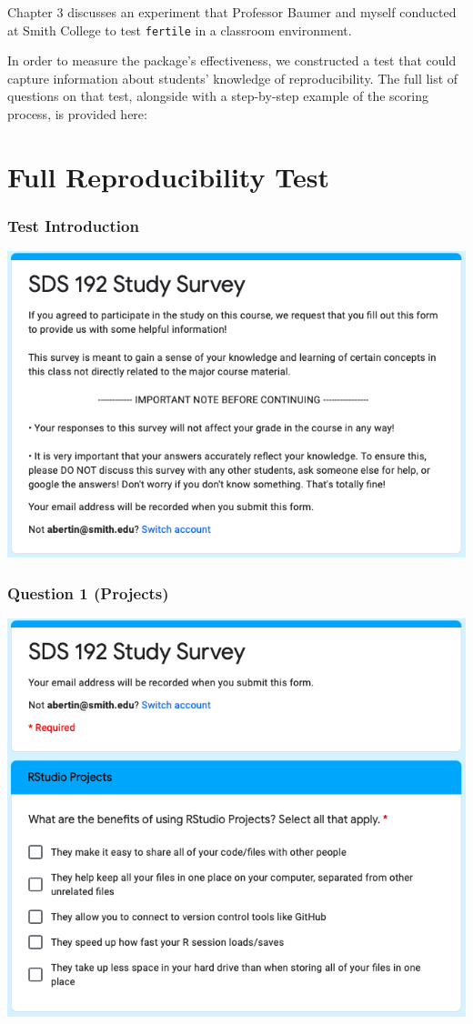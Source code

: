 \documentclass[12pt,twoside]{reedthesis}
\begin{document}
Chapter 3 discusses an experiment that Professor Baumer and myself conducted at Smith College to test \texttt{fertile} in a classroom environment.

In order to measure the package's effectiveness, we constructed a test that could capture information about students' knowledge of reproducibility. The full list of questions on that test, alongside with a step-by-step example of the scoring process, is provided here:

\hypertarget{full-reproducibility-test}{%
\section{Full Reproducibility Test}\label{full-reproducibility-test}}

\hypertarget{test-introduction}{%
\subsubsection{Test Introduction}\label{test-introduction}}

\includegraphics[width=0.8\linewidth]{figure/appendix/test-intro}

\hypertarget{question-1-projects}{%
\subsubsection{Question 1 (Projects)}\label{question-1-projects}}

\includegraphics[width=0.8\linewidth]{figure/appendix/test-1}
\end{document}
